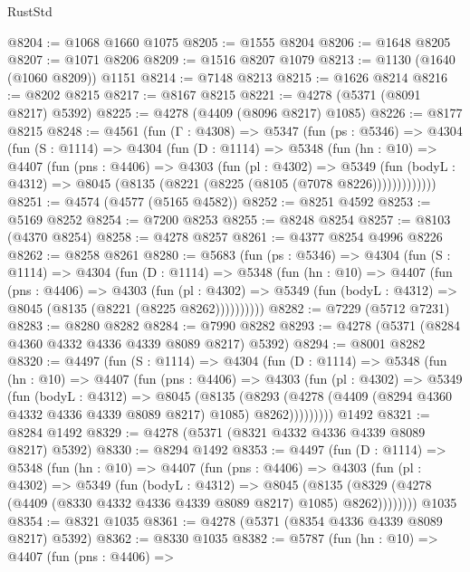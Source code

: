 \begin{lexlean}{RustStd}
\begin{coremodule}
@8204 := @1068 @1660 @1075
@8205 := @1555 @8204
@8206 := @1648 @8205
@8207 := @1071 @8206
@8209 := @1516 @8207 @1079
@8213 := @1130 (@1640 (@1060 @8209)) @1151
@8214 := @7148 @8213
@8215 := @1626 @8214
@8216 := @8202 @8215
@8217 := @8167 @8215
@8221 := @4278 (@5371 (@8091 @8217) @5392)
@8225 := @4278 (@4409 (@8096 @8217) @1085)
@8226 := @8177 @8215
@8248 := @4561
    (fun (Γ : @4308) =>
    @5347
      (fun (ps : @5346) =>
      @4304
        (fun (S : @1114) =>
        @4304
          (fun (D : @1114) =>
          @5348
            (fun (hn : @10) =>
            @4407
              (fun (pns : @4406) =>
              @4303
                (fun (pl : @4302) =>
                @5349
                  (fun (bodyL : @4312) =>
                  @8045 (@8135 (@8221 (@8225 (@8105 (@7078 @8226)))))))))))))
@8251 := @4574 (@4577 (@5165 @4582))
@8252 := @8251 @4592
@8253 := @5169 @8252
@8254 := @7200 @8253
@8255 := @8248 @8254
@8257 := @8103 (@4370 @8254)
@8258 := @4278 @8257
@8261 := @4377 @8254 @4996 @8226
@8262 := @8258 @8261
@8280 := @5683
    (fun (ps : @5346) =>
    @4304
      (fun (S : @1114) =>
      @4304
        (fun (D : @1114) =>
        @5348
          (fun (hn : @10) =>
          @4407
            (fun (pns : @4406) =>
            @4303
              (fun (pl : @4302) =>
              @5349 (fun (bodyL : @4312) => @8045 (@8135 (@8221 (@8225 @8262))))))))))
@8282 := @7229 (@5712 @7231)
@8283 := @8280 @8282
@8284 := @7990 @8282
@8293 := @4278 (@5371 (@8284 @4360 @4332 @4336 @4339 @8089 @8217) @5392)
@8294 := @8001 @8282
@8320 := @4497
    (fun (S : @1114) =>
    @4304
      (fun (D : @1114) =>
      @5348
        (fun (hn : @10) =>
        @4407
          (fun (pns : @4406) =>
          @4303
            (fun (pl : @4302) =>
            @5349
              (fun (bodyL : @4312) =>
              @8045
                (@8135
                  (@8293
                    (@4278 (@4409 (@8294 @4360 @4332 @4336 @4339 @8089 @8217) @1085) @8262)))))))))
    @1492
@8321 := @8284 @1492
@8329 := @4278 (@5371 (@8321 @4332 @4336 @4339 @8089 @8217) @5392)
@8330 := @8294 @1492
@8353 := @4497
    (fun (D : @1114) =>
    @5348
      (fun (hn : @10) =>
      @4407
        (fun (pns : @4406) =>
        @4303
          (fun (pl : @4302) =>
          @5349
            (fun (bodyL : @4312) =>
            @8045
              (@8135 (@8329 (@4278 (@4409 (@8330 @4332 @4336 @4339 @8089 @8217) @1085) @8262))))))))
    @1035
@8354 := @8321 @1035
@8361 := @4278 (@5371 (@8354 @4336 @4339 @8089 @8217) @5392)
@8362 := @8330 @1035
@8382 := @5787
    (fun (hn : @10) =>
    @4407
      (fun (pns : @4406) =>

\end{coremodule}
\end{lexlean}
